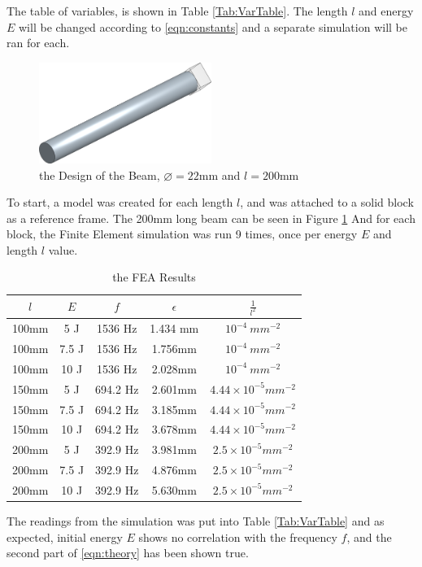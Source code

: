 \documentclass[a4paper,12pt]{article}
\begin{document}
    The table of variables, is shown in Table \ref{Tab:VarTable}. The length $l$ and energy $E$ will be changed according to \eqref{eqn:constants} and a separate simulation will be ran for each.
    \begin{figure}[H]%
    \includegraphics[width=0.5\textwidth]{CADPic}
    \centering
    \caption{the Design of the Beam, $\diameter=22$mm and $l=200$mm}\label{fig:CADPic}
    \centering
    \end{figure}
    To start, a model was created for each length $l$, and was attached to a solid block as a reference frame. The 200mm long beam can be seen in Figure \ref{fig:CADPic}
    And for each block, the Finite Element simulation was run 9 times, once per energy $E$ and length $l$ value.
    \begin{table}[H]%
    \begin{center}
    \begin{tabular}[H]{|c|c||c|c||c|}
    \hline
    $l$ & $E$ & $f$ & $\epsilon$ & $\frac{1}{l^{2}}$\\
    \hline\hline
    100mm & 5 J & 1536 Hz & 1.434 mm & $10^{-4}~mm^{-2}$\\
    \hline
    100mm & 7.5 J & 1536 Hz & 1.756mm & $10^{-4}~mm^{-2}$ \\
    \hline
    100mm & 10 J & 1536 Hz & 2.028mm & $10^{-4}~mm^{-2}$\\
    \hline
    150mm & 5 J & 694.2 Hz & 2.601mm & $4.44\times10^{-5}mm^{-2}$\\
    \hline
    150mm & 7.5 J & 694.2 Hz & 3.185mm & $4.44\times10^{-5}mm^{-2}$\\
    \hline
    150mm & 10 J & 694.2 Hz & 3.678mm & $4.44\times10^{-5}mm^{-2}$\\
    \hline
    200mm & 5 J & 392.9 Hz & 3.981mm & $2.5\times10^{-5}mm^{-2}$\\
    \hline
    200mm & 7.5 J & 392.9 Hz & 4.876mm & $2.5\times10^{-5}mm^{-2}$\\
    \hline
    200mm & 10 J & 392.9 Hz & 5.630mm & $2.5\times10^{-5}mm^{-2}$\\
    \hline
    \end{tabular}
    \end{center}
    \caption{the FEA Results}\label{Tab:FEAtable}
    \end{table}
    The readings from the simulation was put into Table \ref{Tab:VarTable} and as expected, initial energy $E$ shows no correlation with the frequency $f$, and the second part of \eqref{eqn:theory} has been shown true.
\end{document}
